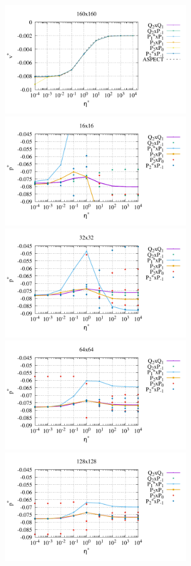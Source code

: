 \begin{center}
\includegraphics[width=8cm]{python_codes/fieldstone_120/paperresults/sinker_reduced/structured/sinker_reduced_vel_160}\\
\includegraphics[width=8cm]{python_codes/fieldstone_120/paperresults/sinker_reduced/structured/sinker_reduced_press_16}
\includegraphics[width=8cm]{python_codes/fieldstone_120/paperresults/sinker_reduced/structured/sinker_reduced_press_32}\\
\includegraphics[width=8cm]{python_codes/fieldstone_120/paperresults/sinker_reduced/structured/sinker_reduced_press_64}
\includegraphics[width=8cm]{python_codes/fieldstone_120/paperresults/sinker_reduced/structured/sinker_reduced_press_128}\\

\end{center}
